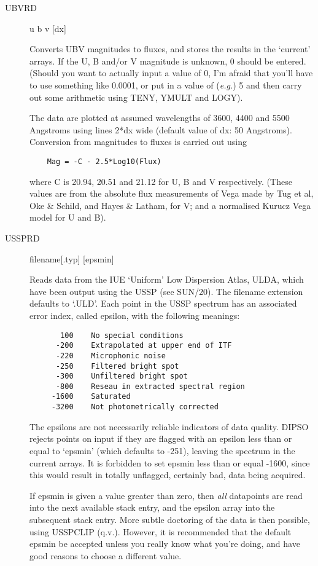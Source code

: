\begin {description}
\item [UBVRD] u b v [dx]

Converts UBV magnitudes to fluxes, and stores the results in the
`current' arrays. If the U, B and/or V magnitude is unknown, 0 should
be entered. (Should you want to actually input a value of 0, I'm
afraid that you'll have to use something like 0.0001, or put in a
value of ({\em e.g.}) 5 and then carry out some arithmetic using TENY,
YMULT and LOGY).

The data are plotted at assumed wavelengths of 3600, 4400  and 5500
Angstroms using lines 2*dx wide (default value of dx: 50 Angstroms).
Conversion from magnitudes to fluxes is carried out using

\begin{verbatim}
    Mag = -C - 2.5*Log10(Flux)
\end{verbatim}

where C is  20.94, 20.51 and 21.12 for U, B and V respectively. (These
values are from the absolute flux measurements of Vega made by Tug et
al, Oke \& Schild, and Hayes \& Latham, for V; and a normalised Kurucz
Vega model for U and B).

\item [USSPRD] filename[.typ] [epsmin]

Reads data from the IUE `Uniform' Low Dispersion Atlas, ULDA, which
have been output using the USSP (see SUN/20). The filename extension
defaults to `.ULD'. Each point in the USSP spectrum has an associated
error index, called epsilon, with the following meanings:

\begin{verbatim}
       100    No special conditions
      -200    Extrapolated at upper end of ITF
      -220    Microphonic noise
      -250    Filtered bright spot
      -300    Unfiltered bright spot
      -800    Reseau in extracted spectral region
     -1600    Saturated
     -3200    Not photometrically corrected
\end{verbatim}

The epsilons are not necessarily reliable indicators of data quality.
DIPSO rejects points on input if they are flagged with an epsilon less
than or equal to `epsmin' (which defaults to -251), leaving the
spectrum in the current arrays. It is forbidden to set epsmin less
than or equal -1600, since this would result in totally unflagged,
certainly bad, data being acquired.

If epsmin is given a value greater than zero, then {\em all}
datapoints are read into the next available stack entry, and the
epsilon array into the subsequent stack entry. More subtle doctoring
of the data is then possible, using USSPCLIP (q.v.). However, it is
recommended that the default epsmin be accepted unless you really know
what you're doing, and have good reasons to choose a different value.


\end{description}

